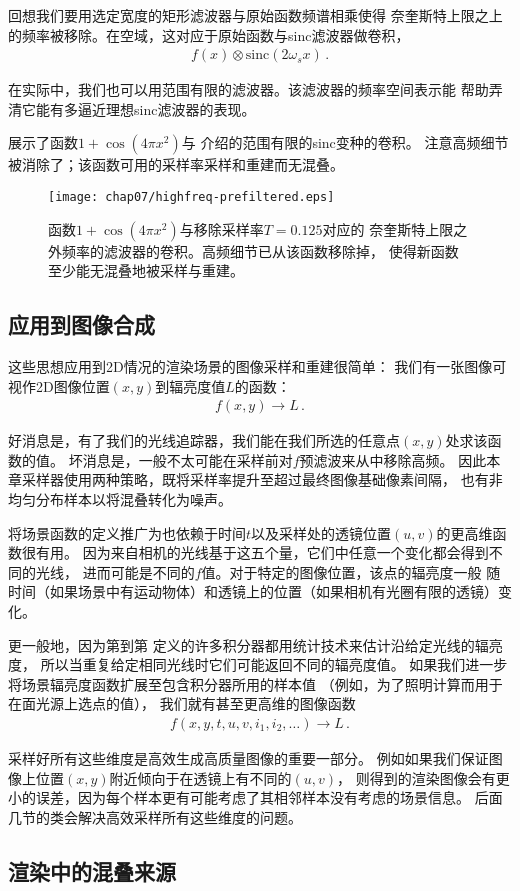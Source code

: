 回想我们要用选定宽度的矩形滤波器与原始函数频谱相乘使得
奈奎斯特上限之上的频率被移除。在空域，这对应于原始函数与sinc滤波器做卷积，
\begin{align*}
    f(x)\otimes \mathrm{sinc}(2\omega_sx)\, .
\end{align*}

在实际中，我们也可以用范围有限的滤波器。该滤波器的频率空间表示能
帮助弄清它能有多逼近理想sinc滤波器的表现。

展示了函数$1+\cos(4\pi x^2)$与
介绍的范围有限的sinc变种的卷积。
注意高频细节被消除了；该函数可用的采样率采样和重建而无混叠。
\begin{figure}[htbp]
    \centering\texttt{[image: chap07/highfreq-prefiltered.eps]}
    \caption{函数$1+\cos(4\pi x^2)$与移除采样率$T=0.125$对应的
        奈奎斯特上限之外频率的滤波器的卷积。高频细节已从该函数移除掉，
        使得新函数至少能无混叠地被采样与重建。}
    \label{fig:7.10}
\end{figure}

\subsection{应用到图像合成}\label{sub:应用到图像合成}
这些思想应用到2D情况的渲染场景的图像采样和重建很简单：
我们有一张图像可视作2D图像位置$(x,y)$到辐亮度值$L$的函数：
\begin{align*}
    f(x,y)\rightarrow L\, .
\end{align*}

好消息是，有了我们的光线追踪器，我们能在我们所选的任意点$(x,y)$处求该函数的值。
坏消息是，一般不太可能在采样前对$f$预滤波来从中移除高频。
因此本章采样器使用两种策略，既将采样率提升至超过最终图像基础像素间隔，
也有非均匀分布样本以将混叠转化为噪声。

将场景函数的定义推广为也依赖于时间$t$以及采样处的透镜位置$(u,v)$的更高维函数很有用。
因为来自相机的光线基于这五个量，它们中任意一个变化都会得到不同的光线，
进而可能是不同的$f$值。对于特定的图像位置，该点的辐亮度一般
随时间（如果场景中有运动物体）和透镜上的位置（如果相机有光圈有限的透镜）变化。

更一般地，因为第到第
定义的许多积分器都用统计技术来估计沿给定光线的辐亮度，
所以当重复给定相同光线时它们可能返回不同的辐亮度值。
如果我们进一步将场景辐亮度函数扩展至包含积分器所用的样本值
（例如，为了照明计算而用于在面光源上选点的值），
我们就有甚至更高维的图像函数
\begin{align*}
    f(x,y,t,u,v,i_1,i_2,\ldots)\rightarrow L\, .
\end{align*}

采样好所有这些维度是高效生成高质量图像的重要一部分。
例如如果我们保证图像上位置$(x,y)$附近倾向于在透镜上有不同的$(u,v)$，
则得到的渲染图像会有更小的误差，因为每个样本更有可能考虑了其相邻样本没有考虑的场景信息。
后面几节的类会解决高效采样所有这些维度的问题。

\subsection{渲染中的混叠来源}\label{sub:渲染中的混叠来源}
